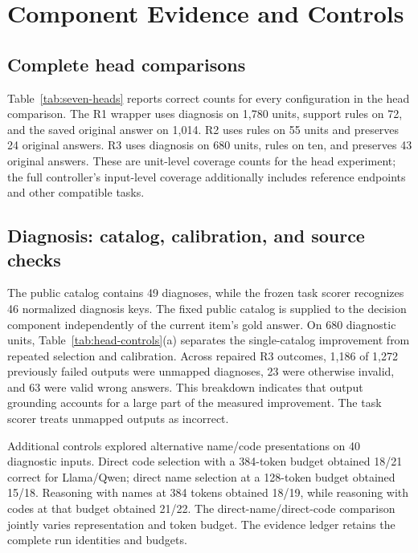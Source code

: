 \section{Component Evidence and Controls}
\label{app:heads}

\subsection{Complete head comparisons}
Table~\ref{tab:seven-heads} reports correct counts for every configuration in the head comparison. The R1 wrapper uses diagnosis on 1,780 units, support rules on 72, and the saved original answer on 1,014. R2 uses rules on 55 units and preserves 24 original answers. R3 uses diagnosis on 680 units, rules on ten, and preserves 43 original answers. These are unit-level coverage counts for the head experiment; the full controller's input-level coverage additionally includes reference endpoints and other compatible tasks.




\subsection{Diagnosis: catalog, calibration, and source checks}
The public catalog contains 49 diagnoses, while the frozen task scorer recognizes 46 normalized diagnosis keys. The fixed public catalog is supplied to the decision component independently of the current item's gold answer. On 680 diagnostic units, Table~\ref{tab:head-controls}(a) separates the single-catalog improvement from repeated selection and calibration. Across repaired R3 outcomes, 1,186 of 1,272 previously failed outputs were unmapped diagnoses, 23 were otherwise invalid, and 63 were valid wrong answers. This breakdown indicates that output grounding accounts for a large part of the measured improvement. The task scorer treats unmapped outputs as incorrect.

Additional controls explored alternative name/code presentations on 40 diagnostic inputs. Direct code selection with a 384-token budget obtained 18/21 correct for Llama/Qwen; direct name selection at a 128-token budget obtained 15/18. Reasoning with names at 384 tokens obtained 18/19, while reasoning with codes at that budget obtained 21/22. The direct-name/direct-code comparison jointly varies representation and token budget. The evidence ledger retains the complete run identities and budgets.

